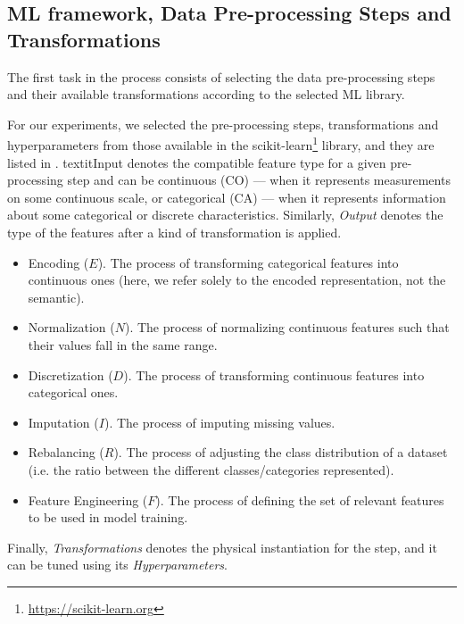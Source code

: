 \subsection{ML framework, Data Pre-processing Steps and Transformations}
\label{effective-ssec:select-framework}

The first task in the process consists of selecting the data pre-processing steps and their available transformations according to the selected ML library.

\begin{example}
For our experiments, we selected the pre-processing steps, transformations and hyperparameters from those available in the scikit-learn\footnote{\url{https://scikit-learn.org}} library, and they are listed in .
textit{Input} denotes the compatible feature type for a given pre-processing step and can be continuous (CO) --- when it represents measurements on some continuous scale, or categorical (CA) --- when it represents information about some categorical or discrete characteristics.
Similarly, \textit{Output} denotes the type of the features after a kind of transformation is applied.

\begin{itemize}[noitemsep,topsep=0pt]
\item{Encoding ($E$).} The process of transforming categorical features into continuous ones (here, we refer solely to the encoded representation, not the semantic).
\item{Normalization ($N$).} The process of normalizing continuous features such that their values fall in the same range.
\item{Discretization ($D$).} The process of transforming continuous features into categorical ones.
\item{Imputation ($I$).} The process of imputing missing values.
\item{Rebalancing ($R$).} The process of adjusting the class distribution of a dataset (i.e. the ratio between the different classes/categories represented).
\item{Feature Engineering ($F$).} The process of defining the set of relevant features to be used in model training.
\end{itemize}

Finally, \textit{Transformations} denotes the physical instantiation for the step, and it can be tuned using its \textit{Hyperparameters}.


\end{example}
